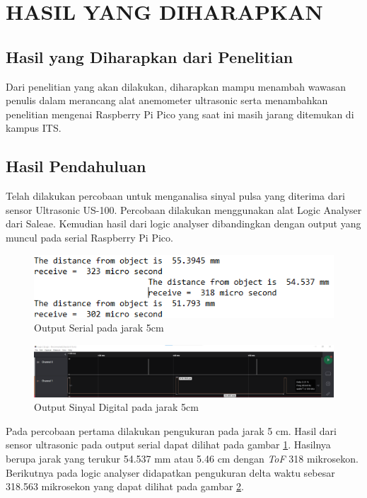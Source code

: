 \section{HASIL YANG DIHARAPKAN}

\subsection{Hasil yang Diharapkan dari Penelitian}

Dari penelitian yang akan dilakukan, diharapkan mampu menambah wawasan penulis dalam merancang alat anemometer ultrasonic serta
menambahkan penelitian mengenai Raspberry Pi Pico yang saat ini masih jarang ditemukan di kampus ITS.

\subsection{Hasil Pendahuluan}

Telah dilakukan percobaan untuk menganalisa
sinyal pulsa yang diterima dari sensor Ultrasonic US-100. Percobaan dilakukan menggunakan alat Logic Analyser dari Saleae. Kemudian hasil dari logic analyser dibandingkan dengan output yang muncul pada 
serial Raspberry Pi Pico.

\begin{figure}[h!]
	\centering
	\includegraphics[width=0.7\linewidth]{gambar/serial5cm}
	\caption{Output Serial pada jarak 5cm}
	\label{fig:serial5cm}
\end{figure}
\begin{figure}[h!]
	\centering
	\includegraphics[width=\linewidth]{gambar/logic5cm}
	\caption{Output Sinyal Digital pada jarak 5cm}
	\label{fig:logic5cm}
\end{figure}

Pada percobaan pertama dilakukan pengukuran pada jarak 5 cm. Hasil dari sensor ultrasonic pada output 
serial dapat dilihat pada gambar \ref{fig:serial5cm}. Hasilnya berupa jarak yang terukur 54.537 mm atau 5.46 cm dengan \textit{ToF} 318 mikrosekon. Berikutnya pada logic analyser didapatkan pengukuran 
delta waktu sebesar 318.563 mikrosekon yang dapat dilihat pada gambar \ref{fig:logic5cm}.


